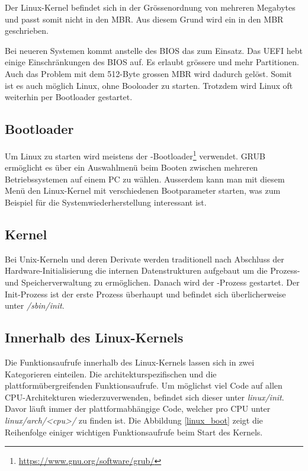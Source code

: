Der Linux-Kernel befindet sich in der Grössenordnung von mehreren Megabytes und passt somit nicht in den MBR.
Aus diesem Grund wird ein  in den MBR geschrieben.

Bei neueren Systemen kommt anstelle des BIOS das  zum Einsatz. Das UEFI hebt einige
Einschränkungen des BIOS auf. Es erlaubt grössere und mehr Partitionen. Auch das Problem mit dem 512-Byte grossen MBR wird dadurch gelöst.
Somit ist es auch möglich Linux, ohne Booloader zu starten. Trotzdem wird Linux oft weiterhin per Bootloader gestartet. 

\subsection{Bootloader}

Um Linux zu starten wird meistens der -Bootloader\footnote{\url{https://www.gnu.org/software/grub/}} 
verwendet. GRUB ermöglicht es über ein Auswahlmenü beim Booten zwischen mehreren Betriebssystemen auf einem PC zu wählen.
Ausserdem kann man mit diesem Menü den Linux-Kernel mit verschiedenen Bootparameter starten, was zum Beispiel für die
Systemwiederherstellung interessant ist.

\subsection{Kernel}

Bei Unix-Kerneln und deren Derivate werden traditionell nach Abschluss der Hardware-Initialisierung
die internen Datenstrukturen aufgebaut um die Prozess- und Speicherverwaltung zu ermöglichen.
Danach wird der -Prozess gestartet. Der Init-Prozess ist der erste
Prozess überhaupt und befindet sich überlicherweise unter \emph{/sbin/init}.

\subsection{Innerhalb des Linux-Kernels}

Die Funktionsaufrufe innerhalb des Linux-Kernels lassen sich in zwei Kategorieren einteilen. Die 
architekturspezifischen und die plattformübergreifenden Funktionsaufrufe. Um möglichst viel Code
auf allen CPU-Architekturen wiederzuverwenden, befindet sich dieser unter \emph{linux/init}.
Davor läuft immer der plattformabhängige Code, welcher pro CPU unter \emph{linux/arch/<cpu>/} zu finden
ist. Die Abbildung \ref{linux_boot} zeigt die Reihenfolge einiger wichtigen Funktionsaufrufe beim Start
des Kernels.

